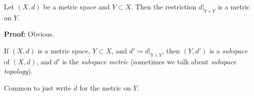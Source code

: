 \documentclass[10pt,aspectratio=169]{beamer}
\begin{document}
%
%
%

\begin{frame}

\begin{proposition}
Let $(X,d)$ be a metric space and $Y \subset X$.  Then the restriction
$d|_{Y \times Y}$ is a metric on $Y$.
\end{proposition}

\pause

\textbf{Proof:} Obvious.

\bigskip

\pause
\begin{definition}
If $(X,d)$ is a metric space, $Y \subset X$, and $d' \coloneqq d|_{Y \times Y}$,
then $(Y,d')$ is a \emph{subspace} of $(X,d)$, and
$d'$ is the \emph{subspace metric} (sometimes we talk about
\emph{subspace topology}).
\end{definition}

\pause
Common to just write $d$ for the metric on $Y$.

\end{frame}
\end{document}
